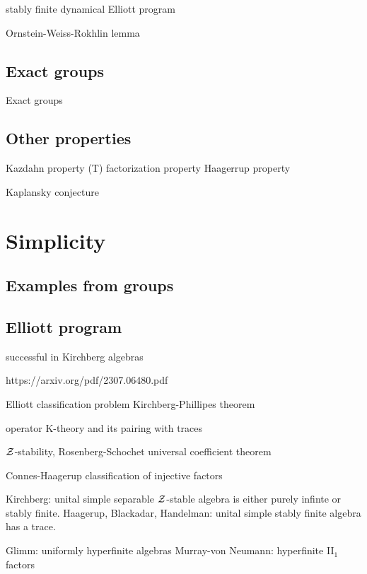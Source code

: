 \documentclass{../../large}
\begin{document}
stably finite
dynamical Elliott program

Ornstein-Weiss-Rokhlin lemma

\section{Exact groups}
Exact groups

\section{Other properties}
Kazdahn property (T)
factorization property
Haagerrup property


Kaplansky conjecture



\chapter{Simplicity}

\section{Examples from groups}

\section{Elliott program}
successful in Kirchberg algebras


https://arxiv.org/pdf/2307.06480.pdf

Elliott classification problem
Kirchberg-Phillipes theorem

operator K-theory and its pairing with traces

$\mathcal{Z}$-stability, Rosenberg-Schochet universal coefficient theorem

Connes-Haagerup classification of injective factors

Kirchberg: unital simple separable $\mathcal{Z}$-stable algebra is either purely infinte or stably finite.
Haagerup, Blackadar, Handelman: unital simple stably finite algebra has a trace.

Glimm: uniformly hyperfinite algebras
Murray-von Neumann: hyperfinite II$_1$ factors
\end{document}
